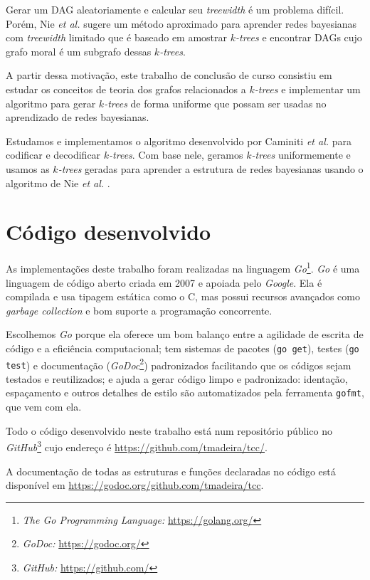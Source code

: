 Gerar um DAG aleatoriamente e calcular seu \emph{treewidth} é um problema difícil. Porém, Nie \emph{et al.} \cite{maua} sugere um método aproximado para aprender redes bayesianas com \emph{treewidth} limitado que é baseado em amostrar \emph{$k$-trees} e encontrar DAGs cujo grafo moral é um subgrafo dessas \emph{$k$-trees}.

A partir dessa motivação, este trabalho de conclusão de curso consistiu em estudar os conceitos de teoria dos grafos relacionados a \emph{$k$-trees} e implementar um algoritmo para gerar \emph{$k$-trees} de forma uniforme que possam ser usadas no aprendizado de redes bayesianas.

Estudamos e implementamos o algoritmo desenvolvido por Caminiti \emph{et al.} \cite{caminiti} para codificar e decodificar \emph{$k$-trees}. Com base nele, geramos \emph{$k$-trees} uniformemente e usamos as \emph{$k$-trees} geradas para aprender a estrutura de redes bayesianas usando o algoritmo de Nie \emph{et al.} \cite{maua}.

\section{Código desenvolvido}

As implementações deste trabalho foram realizadas na linguagem \emph{Go}\footnote{\emph{The Go Programming Language:} \url{https://golang.org/}}. \emph{Go} é uma linguagem de código aberto criada em 2007 e apoiada pelo \emph{Google}. Ela é compilada e usa tipagem estática como o C, mas possui recursos avançados como \emph{garbage collection} e bom suporte a programação concorrente.

Escolhemos \emph{Go} porque ela oferece um bom balanço entre a agilidade de escrita de código e a eficiência computacional; tem sistemas de pacotes ({\tt go get}), testes ({\tt go test}) e documentação (\emph{GoDoc}\footnote{\emph{GoDoc:} \url{https://godoc.org/}}) padronizados facilitando que os códigos sejam testados e reutilizados; e ajuda a gerar código limpo e padronizado: identação, espaçamento e outros detalhes de estilo são automatizados pela ferramenta {\tt gofmt}, que vem com ela.

Todo o código desenvolvido neste trabalho está num repositório público no \emph{GitHub}\footnote{\emph{GitHub:} \url{https://github.com/}} cujo endereço é \url{https://github.com/tmadeira/tcc/}.

A documentação de todas as estruturas e funções declaradas no código está disponível em \url{https://godoc.org/github.com/tmadeira/tcc}.

